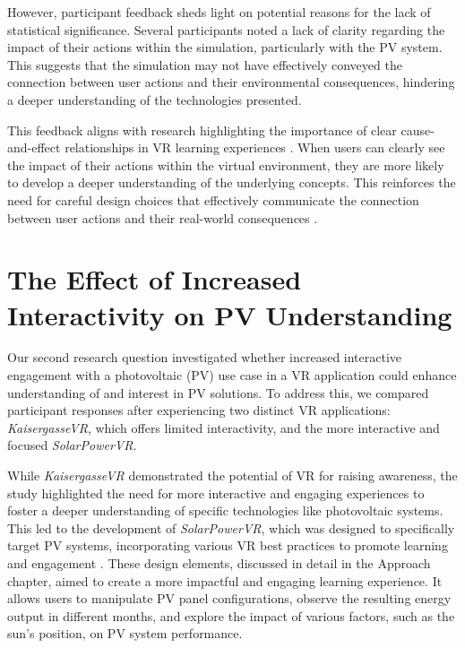 \documentclass[draft, final]{vutinfth} %
\begin{document}
However, participant feedback sheds light on potential reasons for the lack of statistical significance. Several participants noted a lack of clarity regarding the impact of their actions within the simulation, particularly with the PV system. This suggests that the simulation may not have effectively conveyed the connection between user actions and their environmental consequences, hindering a deeper understanding of the technologies presented.

This feedback aligns with research highlighting the importance of clear cause-and-effect relationships in VR learning experiences \cite{Bailenson2008Transformations, Merchant2014VrEffectiveness}. When users can clearly see the impact of their actions within the virtual environment, they are more likely to develop a deeper understanding of the underlying concepts. This reinforces the need for careful design choices that effectively communicate the connection between user actions and their real-world consequences \cite{Ding2022VrApplication}.

\section{The Effect of Increased Interactivity on PV Understanding}

Our second research question investigated whether increased interactive engagement with a photovoltaic (PV) use case in a VR application could enhance understanding of and interest in PV solutions. To address this, we compared participant responses after experiencing two distinct VR applications: \textit{KaisergasseVR}, which offers limited interactivity, and the more interactive and focused \textit{SolarPowerVR}.

While \textit{KaisergasseVR} demonstrated the potential of VR for raising awareness, the study highlighted the need for more interactive and engaging experiences to foster a deeper understanding of specific technologies like photovoltaic systems. This led to the development of \textit{SolarPowerVR}, which was designed to specifically target PV systems, incorporating various VR best practices to promote learning and engagement \cite{Dalgarno2010Learning, Gee2009Deep}. These design elements, discussed in detail in the Approach chapter, aimed to create a more impactful and engaging learning experience. It allows users to manipulate PV panel configurations, observe the resulting energy output in different months, and explore the impact of various factors, such as the sun's position, on PV system performance.
\end{document}
